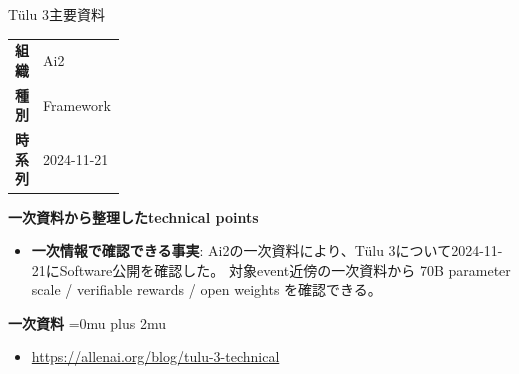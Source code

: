 \begin{technicalnote}{Tülu 3}{主要資料}
\begingroup
\begin{tabularx}{\linewidth}{@{}>{\bfseries}p{0.22\linewidth}X@{}}
組織 & Ai2 \\
種別 & Framework \\
時系列 & 2024-11-21 \\
\end{tabularx}
\smallskip
{\bfseries 一次資料から整理したtechnical points}
\begin{itemize}[leftmargin=1.5em,itemsep=0.35em]
\item \textbf{一次情報で確認できる事実}: Ai2の一次資料により、Tülu 3について2024-11-21にSoftware公開を確認した。 対象event近傍の一次資料から 70B parameter scale / verifiable rewards / open weights を確認できる。
\end{itemize}
\begin{minipage}{\linewidth}
\begin{samepage}
{\bfseries 一次資料}
\begingroup\sloppy
\Urlmuskip=0mu plus 2mu\relax
\begin{itemize}[leftmargin=1.5em,itemsep=0.25em]
\item {\scriptsize\url{https://allenai.org/blog/tulu-3-technical}}
\end{itemize}
\endgroup
\end{samepage}
\end{minipage}
\endgroup
\end{technicalnote}
\medskip

